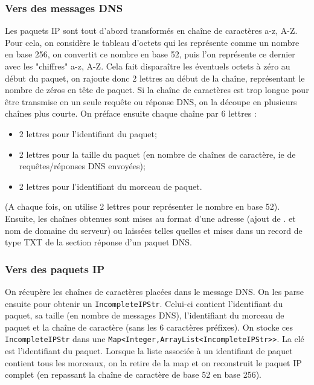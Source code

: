 \documentclass[a4paper,12pt]{article}
\begin{document}
		\subsubsection{Vers des messages DNS}
	Les paquets IP sont tout d'abord transformés en chaîne de caractères a-z, A-Z. Pour cela, on considère le tableau d'octets qui les représente comme un nombre en base 256, on convertit ce nombre en base 52, puis l'on représente ce dernier avec les "chiffres" a-z, A-Z. Cela fait disparaître les éventuels octets à zéro au début du paquet, on rajoute donc 2 lettres au début de la chaîne, représentant le nombre de zéros en tête de paquet.\newline
	Si la chaîne de caractères est trop longue pour être transmise en un seule requête ou réponse DNS, on la découpe en plusieurs chaînes plus courte. On préface ensuite chaque chaîne par 6 lettres :
	\begin{itemize}
		\item 2 lettres pour l'identifiant du paquet;
		\item 2 lettres pour la taille du paquet (en nombre de chaînes de caractère, ie de requêtes/réponses DNS envoyées);
		\item 2 lettres pour l'identifiant du morceau de paquet.
	\end{itemize}
	(A chaque fois, on utilise 2 lettres pour représenter le nombre en base 52).\newline
	Ensuite, les chaînes obtenues sont mises au format d'une adresse (ajout de . et nom de domaine du serveur) ou laissées telles quelles et mises dans un record de type TXT de la section réponse d'un paquet DNS.

		\subsubsection{Vers des paquets IP}
	On récupère les chaînes de caractères placées dans le message DNS. On les parse ensuite pour obtenir un \verb?IncompleteIPStr?. Celui-ci contient l'identifiant du paquet, sa taille (en nombre de messages DNS), l'identifiant du morceau de paquet et la chaîne de caractère (sans les 6 caractères préfixes). On stocke ces \verb?IncompleteIPStr? dans une \newline \verb?Map<Integer,ArrayList<IncompleteIPStr>>?. La clé est l'identifiant du paquet. Lorsque la liste associée à un identifiant de paquet contient tous les morceaux, on la retire de la map et on reconstruit le paquet IP complet (en repassant la chaîne de caractère de base 52 en base 256).
	
	
\end{document}

